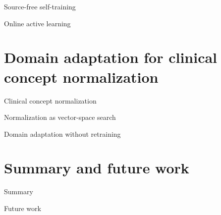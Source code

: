 \documentclass[14pt]{beamer}
\begin{document}
\begin{frame}{Source-free self-training}
\end{frame}

\begin{frame}{Online active learning}
\end{frame}

\section{Domain adaptation for clinical concept normalization}

\begin{frame}{Clinical concept normalization}
\end{frame}

\begin{frame}{Normalization as vector-space search}
\end{frame}

\begin{frame}{Domain adaptation without retraining}
\end{frame}

\section*{Summary and future work}

\begin{frame}{Summary}
\end{frame}

\begin{frame}{Future work}
\end{frame}
\end{document}
